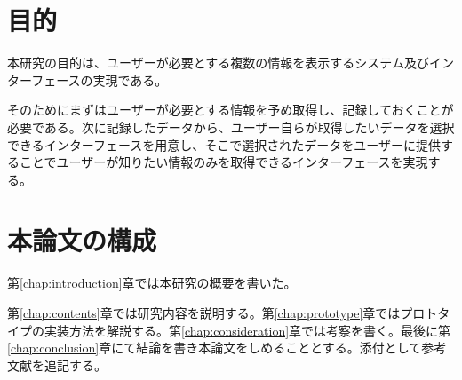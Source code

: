 \section{目的}
本研究の目的は、ユーザーが必要とする複数の情報を表示するシステム及びインターフェースの実現である。

そのためにまずはユーザーが必要とする情報を予め取得し、記録しておくことが必要である。次に記録したデータから、ユーザー自らが取得したいデータを選択できるインターフェースを用意し、そこで選択されたデータをユーザーに提供することでユーザーが知りたい情報のみを取得できるインターフェースを実現する。

\section{本論文の構成}
第\ref{chap:introduction}章では本研究の概要を書いた。

第\ref{chap:contents}章では研究内容を説明する。第\ref{chap:prototype}章ではプロトタイプの実装方法を解説する。第\ref{chap:consideration}章では考察を書く。最後に第\ref{chap:conclusion}章にて結論を書き本論文をしめることとする。添付として参考文献を追記する。
